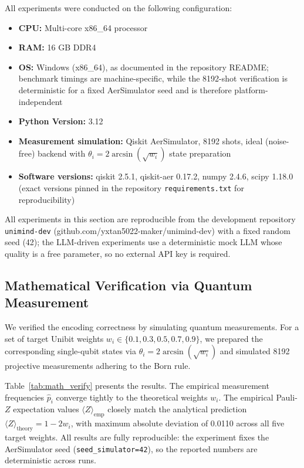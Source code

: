 ﻿\documentclass[12pt,a4paper]{article}
\begin{document}
All experiments were conducted on the following configuration:
\begin{itemize}
    \item \textbf{CPU:} Multi-core x86\_64 processor
    \item \textbf{RAM:} 16 GB DDR4
    \item \textbf{OS:} Windows (x86\_64), as documented in the repository README; benchmark timings are machine-specific, while the 8192-shot verification is deterministic for a fixed AerSimulator seed and is therefore platform-independent
    \item \textbf{Python Version:} 3.12
    \item \textbf{Measurement simulation:} Qiskit AerSimulator, 8192 shots, ideal (noise-free) backend with $\theta_i = 2\arcsin(\sqrt{w_i})$ state preparation
    \item \textbf{Software versions:} qiskit 2.5.1, qiskit-aer 0.17.2, numpy 2.4.6, scipy 1.18.0 (exact versions pinned in the repository \texttt{requirements.txt} for reproducibility)
\end{itemize}
All experiments in this section are reproducible from the development repository \texttt{unimind-dev} (github.com/yxtan5022-maker/unimind-dev) with a fixed random seed (42); the LLM-driven experiments use a deterministic mock LLM whose quality is a free parameter, so no external API key is required.

\subsection{Mathematical Verification via Quantum Measurement}\label{sec:math_verify}

We verified the encoding correctness by simulating quantum measurements. For a set of target Unibit weights $w_i \in \{0.1, 0.3, 0.5, 0.7, 0.9\}$, we prepared the corresponding single-qubit states via $\theta_i = 2\arcsin(\sqrt{w_i})$ and simulated 8192 projective measurements adhering to the Born rule.

Table~\ref{tab:math_verify} presents the results. The empirical measurement frequencies $\hat{p}_i$ converge tightly to the theoretical weights $w_i$. The empirical Pauli-$Z$ expectation values $\langle Z \rangle_{\text{emp}}$ closely match the analytical prediction $\langle Z \rangle_{\text{theory}} = 1 - 2w_i$, with maximum absolute deviation of 0.0110 across all five target weights. All results are fully reproducible: the experiment fixes the AerSimulator seed (\texttt{seed\_simulator=42}), so the reported numbers are deterministic across runs.
\end{document}
